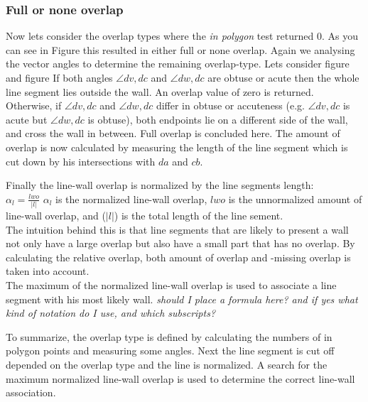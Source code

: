 \documentclass[10pt]{article}
\begin{document}
	\subsubsection{Full or none overlap}
	Now lets consider the overlap types where the \emph{in polygon} test
	returned 0.
	As you can see in Figure %
	this resulted in either full or none overlap.
	Again we analysing the vector angles to determine the remaining overlap-type.
	Lets consider 
	figure %
	and figure %
	If both angles $\angle dv, dc$ and $\angle dw,dc$ are obtuse or acute
	then the whole line segment lies outside the wall. An overlap value of zero
	is returned.\\
	Otherwise, if $\angle dv, dc$ and $\angle dw,dc$ differ in obtuse or accuteness
	(e.g. $\angle dv, dc$ is acute but $\angle dw, dc$ is obtuse), 
	both endpoints lie on a different side of the wall, and cross the wall in
	between. Full overlap is concluded here. 
	The amount of overlap is now calculated by measuring the length
	of the line segment which is cut down by his intersections with $da$ and
	$cb$.
	
	Finally the line-wall overlap is normalized by the line segments length:\\
	$\alpha_{l} = \frac{lwo}{|l|}$
	$\alpha_{l}$ is the normalized line-wall overlap, 
	$lwo$ is the unnormalized amount of line-wall overlap, 
	and ($|l|$) is the total length of the line sement.\\

	The intuition behind this is that line segments that are likely to
	present a wall not only have a large overlap but also have a small part
	that has no overlap. By calculating the relative overlap, both amount of overlap
	and -missing overlap is taken into account.\\

	The maximum of the normalized line-wall overlap is used to associate a
	line segment with his most likely wall.
	\emph{should I place a formula here? and if yes what kind of
	notation do I use, and which subscripts?}

	To summarize, the overlap type is defined by calculating the numbers of in
	polygon points and measuring some angles. Next the line segment is cut off
	depended on the overlap type and the line is normalized. A search for the
	maximum normalized line-wall overlap is used to determine the correct line-wall
	association.

	
\end{document}
